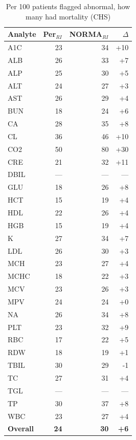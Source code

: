 \begin{table}[ht]
\centering
\footnotesize
\caption{Per 100 patients flagged abnormal, how many had mortality (CHS)}
\begin{tabular}{lrrr}
\toprule
Analyte & Per$_{RI}$ & NORMA$_{RI}$ & $\Delta$ \\
\midrule
A1C & 23 & 34 & +10 \\
ALB & 26 & 33 & +7 \\
ALP & 25 & 30 & +5 \\
ALT & 24 & 27 & +3 \\
AST & 26 & 29 & +4 \\
BUN & 18 & 24 & +6 \\
CA & 28 & 35 & +8 \\
CL & 36 & 46 & +10 \\
CO2 & 50 & 80 & +30 \\
CRE & 21 & 32 & +11 \\
DBIL & --- & --- & --- \\
GLU & 18 & 26 & +8 \\
HCT & 15 & 19 & +4 \\
HDL & 22 & 26 & +4 \\
HGB & 15 & 19 & +4 \\
K & 27 & 34 & +7 \\
LDL & 26 & 30 & +3 \\
MCH & 23 & 27 & +4 \\
MCHC & 18 & 22 & +3 \\
MCV & 23 & 26 & +3 \\
MPV & 24 & 24 & +0 \\
NA & 26 & 34 & +8 \\
PLT & 23 & 32 & +9 \\
RBC & 17 & 22 & +5 \\
RDW & 18 & 19 & +1 \\
TBIL & 30 & 29 & -1 \\
TC & 27 & 31 & +4 \\
TGL & --- & --- & --- \\
TP & 30 & 37 & +8 \\
WBC & 23 & 27 & +4 \\
\midrule
\textbf{Overall} & \textbf{24} & \textbf{30} & \textbf{+6} \\
\bottomrule
\end{tabular}
\end{table}